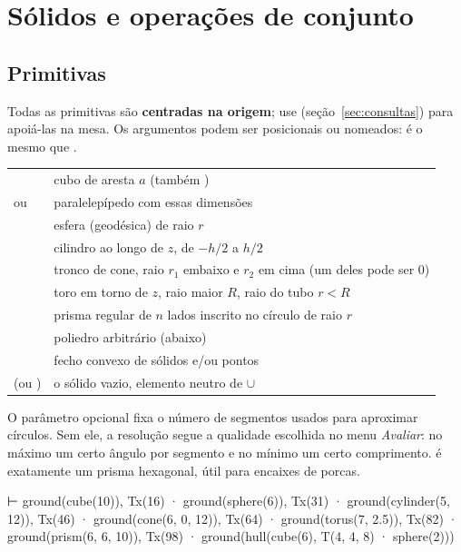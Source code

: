 \section{Sólidos e operações de conjunto}\label{sec:solidos}

\subsection{Primitivas}
Todas as primitivas são \textbf{centradas na origem}; use  (seção~\ref{sec:consultas}) para apoiá-las na mesa. Os argumentos
podem ser posicionais ou nomeados:  é o mesmo que .
\begin{longtable}{@{}L{0.4}L{0.60}@{}}
\toprule
{} &  \\
\midrule
{} & cubo de aresta $a$ (também ) \\
 ou  & paralelepípedo com essas dimensões \\
 & esfera (geodésica) de raio $r$ \\
 & cilindro ao longo de $z$, de $-h/2$ a $h/2$ \\
 & tronco de cone, raio $r_1$ embaixo e $r_2$ em cima (um deles pode ser 0) \\
 & toro em torno de $z$, raio maior $R$, raio do tubo $r < R$ \\
 & prisma regular de $n$ lados inscrito no círculo de raio $r$ \\
 & poliedro arbitrário (abaixo) \\
 & fecho convexo de sólidos e/ou pontos \\
 (ou ) & o sólido vazio, elemento neutro de $\cup$ \\
\bottomrule
\end{longtable}
O parâmetro opcional  fixa o número de segmentos usados para aproximar círculos. Sem ele, a resolução
segue a qualidade escolhida no menu \emph{Avaliar}: no máximo um certo ângulo por segmento e no mínimo um certo comprimento.
 é exatamente um prisma hexagonal, útil para encaixes de porcas.

\begin{csg}[run, id=prims]
⊢ ground(cube(10)), Tx(16) · ground(sphere(6)), Tx(31) · ground(cylinder(5, 12)),
  Tx(46) · ground(cone(6, 0, 12)), Tx(64) · ground(torus(7, 2.5)), Tx(82) · ground(prism(6, 6, 10)),
  Tx(98) · ground(hull(cube(6), T(4, 4, 8) · sphere(2)))
\end{csg}

